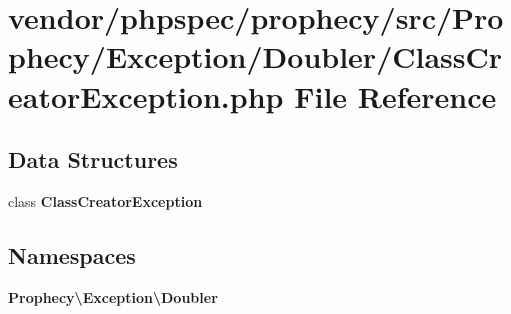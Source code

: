 \section{vendor/phpspec/prophecy/src/\+Prophecy/\+Exception/\+Doubler/\+Class\+Creator\+Exception.php File Reference}
\label{_class_creator_exception_8php}
\subsection*{Data Structures}
\begin{DoxyCompactItemize}
\item 
class {\bf Class\+Creator\+Exception}
\end{DoxyCompactItemize}
\subsection*{Namespaces}
\begin{DoxyCompactItemize}
\item 
 {\bf Prophecy\textbackslash{}\+Exception\textbackslash{}\+Doubler}
\end{DoxyCompactItemize}
